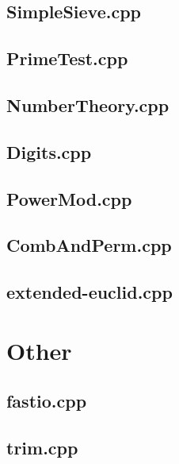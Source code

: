 \documentclass[10pt,twocolumn,landscape]{article}
\begin{document}
\subsection{SimpleSieve.cpp}


\subsection{PrimeTest.cpp}


\subsection{NumberTheory.cpp}


\subsection{Digits.cpp}


\subsection{PowerMod.cpp}


\subsection{CombAndPerm.cpp}


\subsection{extended-euclid.cpp}


\section{Other}

\subsection{fastio.cpp}


\subsection{trim.cpp}

\end{document}
